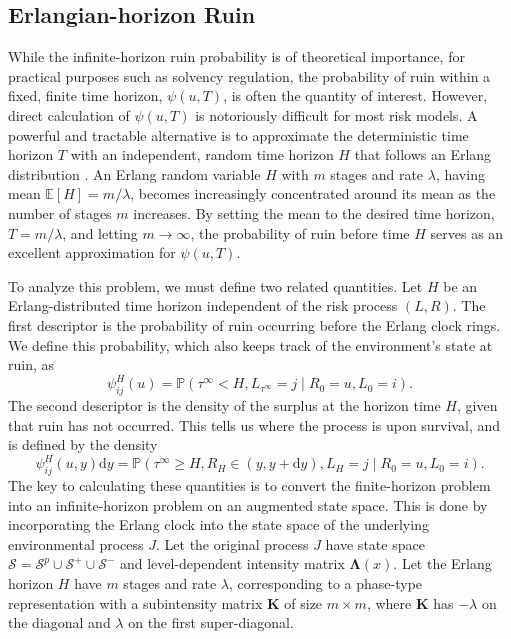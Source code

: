 \documentclass[11pt]{article}
\numberwithin{table}{section}
\numberwithin{figure}{section}
\numberwithin{equation}{section}
\newcommand{\dd}{\mathrm{d}}
\newcommand{\1}{{\mathbf 1}}
\newcommand{\0}{\mat{0}}
\begin{document}
\subsection{Erlangian-horizon Ruin}

While the infinite-horizon ruin probability is of theoretical importance, for practical purposes such as solvency regulation, the probability of ruin within a fixed, finite time horizon, \(\psi(u,T)\), is often the quantity of interest. However, direct calculation of \(\psi(u,T)\) is notoriously difficult for most risk models. A powerful and tractable alternative is to approximate the deterministic time horizon \(T\) with an independent, random time horizon \(H\) that follows an Erlang distribution \cite{asmussen2002erlangian}. An Erlang random variable \(H\) with \(m\) stages and rate \(\lambda\), having mean \(\mathbb{E}[H] = m/\lambda\), becomes increasingly concentrated around its mean as the number of stages \(m\) increases. By setting the mean to the desired time horizon, \(T = m/\lambda\), and letting \(m \to \infty\), the probability of ruin before time \(H\) serves as an excellent approximation for \(\psi(u,T)\).

To analyze this problem, we must define two related quantities. Let \(H\) be an Erlang-distributed time horizon independent of the risk process \((L,R)\). The first descriptor is the probability of ruin occurring before the Erlang clock rings. We define this probability, which also keeps track of the environment's state at ruin, as
\[
\psi_{ij}^H(u) = \mathbb{P}(\tau^\infty < H, L_{\tau^\infty} = j \mid R_0 = u, L_0 = i).
\]
The second descriptor is the density of the surplus at the horizon time \(H\), given that ruin has not occurred. This tells us where the process is upon survival, and is defined by the density
\[
\psi_{ij}^H(u, y) \dd y = \mathbb{P}(\tau^\infty \ge H, R_H \in (y, y+\dd y), L_H = j \mid R_0 = u, L_0 = i).
\]
The key to calculating these quantities is to convert the finite-horizon problem into an infinite-horizon problem on an augmented state space. This is done by incorporating the Erlang clock into the state space of the underlying environmental process \(J\). Let the original process \(J\) have state space \(\mathcal{S} = \mathcal{S}^p \cup \mathcal{S}^+ \cup \mathcal{S}^-\) and level-dependent intensity matrix \(\bm{\Lambda}(x)\). Let the Erlang horizon \(H\) have \(m\) stages and rate \(\lambda\), corresponding to a phase-type representation with a subintensity matrix \(\bm{K}\) of size \(m \times m\), where \(\bm{K}\) has \(-\lambda\) on the diagonal and \(\lambda\) on the first super-diagonal.
\end{document}
